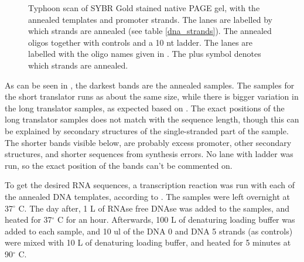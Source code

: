 \begin{figure}[h]
\begin{subfigure}[t]{0.46\textwidth}
  \caption{}
  \label{translator_annealing_2}
\end{subfigure}
\caption{ Typhoon scan of SYBR Gold stained native PAGE gel, with the annealed templates and promoter strands. The lanes are labelled by which strands are annealed (see table \ref{dna_strands}).  The annealed oligos together with controls and a 10 nt ladder. The lanes are labelled with the oligo names given in . The plus symbol denotes which strands are annealed.}
\end{figure}

As can be seen in , the darkest bands are the annealed samples. The samples for the short translator runs as about the same size, while there is bigger variation in the long translator samples, as expected based on . The exact positions of the long translator samples does not match with the sequence length, though this can be explained by secondary structures of the single-stranded part of the sample. The shorter bands visible below, are probably excess promoter, other secondary structures, and shorter sequences from synthesis errors. No lane with ladder was run, so the exact position of the bands can't be commented on.

To get the desired RNA sequences, a transcription reaction was run with each of the annealed DNA templates, according to . The samples were left overnight at 37$^\circ$ C. The day after, 1 \si{\micro}L of RNAse free DNAse was added to the samples, and heated for 37$^\circ$ C for an hour. Afterwards, 100 \si{\micro}L of denaturing loading buffer was added to each sample, and 10 ul of the DNA 0 and DNA 5 strands (as controls) were mixed with 10 \si{\micro}L of denaturing loading buffer, and heated for 5 minutes at 90$^\circ$ C.

